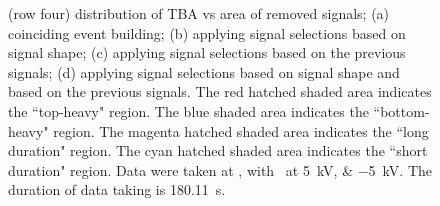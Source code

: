 \begin{landscape}
\begin{figure}[!p]
{			(row four) distribution of TBA vs area of removed signals;
			(a) coinciding event building; 
			(b) applying signal selections based on signal shape;
			(c) applying signal selections based on the previous signals;
			(d) applying signal selections based on signal shape and based on the previous signals.
			The red hatched shaded area indicates the ``top-heavy" region.
			The blue shaded area indicates the ``bottom-heavy" region.
			The magenta hatched shaded area indicates the ``long duration" region.
			The cyan hatched shaded area indicates the ``short duration" region.
			Data were taken at , with \opvtvb\ at \SIlist{+5;-5}{kV}. The duration of data taking is \SI{180.11}{\s}.
		}
		\label{fig:signal selection dv 10}
	\end{figure}
\end{landscape}
